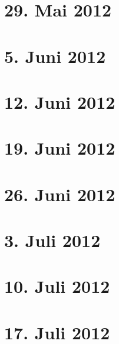 \documentclass[paper = A4, fontsize=12pt, numbers=noendperiod, chapterprefix=true]{scrbook}
\theoremstyle{break}
\theoremstyle{nonumberbreak}
\theoremstyle{nonumberplain}
\begin{document}
\newpage
\section{29. Mai 2012}
\setcounter{Aufg}{0}
\setcounter{Loes}{0}

\newpage
\section{5. Juni 2012}
\setcounter{Aufg}{0}
\setcounter{Loes}{0}

\newpage
\section{12. Juni 2012}
\setcounter{Aufg}{0}
\setcounter{Loes}{0}

\newpage
\section{19. Juni 2012}
\setcounter{Aufg}{0}
\setcounter{Loes}{0}

\newpage
\section{26. Juni 2012}
\setcounter{Aufg}{0}
\setcounter{Loes}{0}

\newpage
\section{3. Juli 2012}
\setcounter{Aufg}{0}
\setcounter{Loes}{0}

\newpage
\section{10. Juli 2012}
\setcounter{Aufg}{0}
\setcounter{Loes}{0}

\newpage
\section{17. Juli 2012}
\setcounter{Aufg}{0}
\setcounter{Loes}{0}
\end{document}
